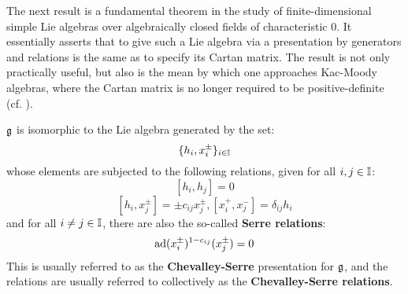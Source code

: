         The next result is a fundamental theorem in the study of finite-dimensional simple Lie algebras over algebraically closed fields of characteristic $0$. It essentially asserts that to give such a Lie algebra via a presentation by generators and relations is the same as to specify its Cartan matrix. The result is not only practically useful, but also is the mean by which one approaches Kac-Moody algebras, where the Cartan matrix is no longer required to be positive-definite (cf. \cite[Chapters 1-5]{kac_infinite_dimensional_lie_algebras}). 
        \begin{theorem} \label{theorem: serre_theorem_for_finite_dimensional_simple_lie_algebras}
            $\mathfrak{g}$ is isomorphic to the Lie algebra generated by the set:
                $$\{h_i, x_i^{\pm}\}_{i \in \mathbb{I}}$$
            whose elements are subjected to the following relations, given for all $i, j \in \mathbb{I}$:
                $$[h_i, h_j] = 0$$
                $$[h_i, x_j^{\pm}] = \pm c_{ij} x_j^{\pm}, [x_i^+, x_j^-] = \delta_{ij} h_i$$
            and for all $i \not = j \in \mathbb{I}$, there are also the so-called \textbf{Serre relations}:
                $$\mathrm{ad}(x_i^{\pm})^{1 - c_{ij}}(x_j^{\pm}) = 0$$
            This is usually referred to as the \textbf{Chevalley-Serre} presentation for $\mathfrak{g}$, and the relations are usually referred to collectively as the \textbf{Chevalley-Serre relations}.
        \end{theorem}

